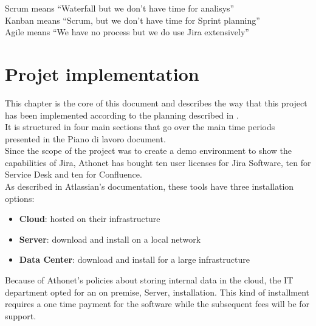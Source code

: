 \begin{savequote}[90mm]
	Scrum means ``Waterfall but we don't have time for analisys''\\
	Kanban means ``Scrum, but we don't have time for Sprint planning''\\
	Agile means ``We have no process but we do use Jira extensively''
\end{savequote}


\chapter{Projet implementation}
\label{chapter_5}
	This chapter is the core of this document and describes the way that this project has been implemented according to the planning described in .\\
	It is structured in four main sections that go over the main time periods presented in the Piano di lavoro document.\\
	Since the scope of the project was to create a demo environment to show the capabilities of Jira, Athonet has bought ten user licenses for Jira Software, ten for Service Desk and ten for Confluence.\\
	As described in Atlassian's documentation\cite{compare-atlassian-cloud-vs-server}, these tools have three installation options:
	\begin{itemize}
		\item \textbf{Cloud}: hosted on their infrastructure
		\item \textbf{Server}: download and install on a local network
		\item \textbf{Data Center}: download and install for a large infrastructure
	\end{itemize}
	Because of Athonet's policies about storing internal data in the cloud, the IT department opted for an on premise, Server, installation.
	This kind of installment requires a one time payment for the software while the subsequent fees will be for support.

